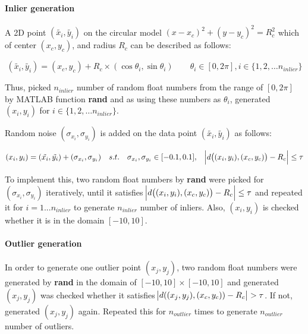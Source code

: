 \documentclass[paper=a4, fontsize=11pt]{scrartcl} %
\numberwithin{equation}{section} %
\numberwithin{figure}{section} %
\numberwithin{table}{section} %
\newcommand{\funcname}[1]{\textbf{#1}}
\begin{document}
\paragraph{Inlier generation}

A 2D point $(\tilde{x_{i}}, \tilde{y_{i}})$ on the circular model $(x-x_{c})^{2} + (y-y_c)^{2} = R_{c}^{2}$ which of center $(x_{c}, y_{c})$, and radius $R_{c}$ can be described as follows:

\begin{equation*}
(\tilde{x_{i}}, \tilde{y_{i}}) = (x_{c}, y_{c}) + R_{c} \times (\cos \theta_{i}, \sin \theta_{i}) \qquad \theta_{i} \in [0, 2 \pi], i \in \{1, 2, \dots n_{inlier} \}
\end{equation*}

Thus, picked $n_{inlier}$ number of random float numbers from the range of  $[0, 2 \pi]$ by MATLAB function \funcname{rand} and as using these numbers as $\theta_{i}$, generated $(x_{i}, y_{i})$ for $i \in \{1, 2, \dots n_{inlier} \}$.  

Random noise $(\sigma_{x_{i}}, \sigma_{y_{i}})$ is added on the data point $(\tilde{x_{i}}, \tilde{y_{i}})$ as follows:

\begin{equation*}
(x_{i}, y_{i}) = (\tilde{x_{i}}, \tilde{y_{i}}) + (\sigma_{x_{i}}, \sigma_{y_{i}}) 
\quad s.t. \quad \sigma_{x_{i}}, \sigma_{y_{i}} \in [-0.1, 0.1], \quad \abs{d \big( (x_{i}, y_{i}), (x_{c}, y_{c}) \big) - R_{c}} \leq \tau 
\end{equation*}

To implement this, two random float numbers by \funcname{rand} were picked for $(\sigma_{x_{i}}, \sigma_{y_{i}})$ iteratively, until it satisfies $\abs{d \big( (x_{i}, y_{i}), (x_{c}, y_{c}) \big) - R_{c}} \leq \tau$ and repeated it for $i=1...n_{inlier}$ to generate $n_{inlier}$ number of inliers. Also, $(x_{i}, y_{i})$ is checked whether it is in the domain $[-10, 10]$.

\paragraph{Outlier generation}

In order to generate one outlier point $(x_{j}, y_{j})$, two random float numbers were generated by \funcname{rand} in the domain of $[-10, 10] \times [-10, 10]$ and generated $(x_{j}, y_{j})$ was checked whether it satisfies $\abs{d((x_{j}, y_{j}), (x_{c}, y_{c})) - R_{c}} > \tau$. If not, generated $(x_{j}, y_{j})$ again. Repeated this for $n_{outlier}$ times to generate $n_{outlier}$ number of outliers.
\end{document}
